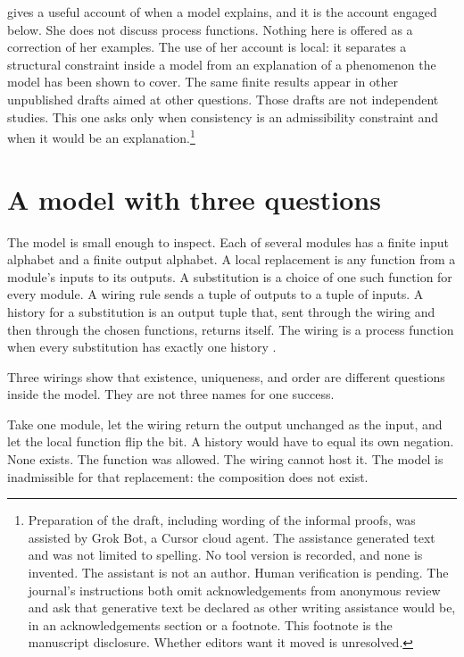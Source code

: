\documentclass[12pt]{article}
\begin{document}
\citet{bokulich2011} gives a useful account of when a model explains, and it is the account engaged below. She does not discuss process functions. Nothing here is offered as a correction of her examples. The use of her account is local: it separates a structural constraint inside a model from an explanation of a phenomenon the model has been shown to cover. The same finite results appear in other unpublished drafts aimed at other questions. Those drafts are not independent studies. This one asks only when consistency is an admissibility constraint and when it would be an explanation.\footnote{Preparation of the draft, including wording of the informal proofs, was assisted by Grok Bot, a Cursor cloud agent. The assistance generated text and was not limited to spelling. No tool version is recorded, and none is invented. The assistant is not an author. Human verification is pending. The journal's instructions both omit acknowledgements from anonymous review and ask that generative text be declared as other writing assistance would be, in an acknowledgements section or a footnote. This footnote is the manuscript disclosure. Whether editors want it moved is unresolved.}

\section{A model with three questions}
\label{sec:model}

The model is small enough to inspect. Each of several modules has a finite input alphabet and a finite output alphabet. A local replacement is any function from a module's inputs to its outputs. A substitution is a choice of one such function for every module. A wiring rule sends a tuple of outputs to a tuple of inputs. A history for a substitution is an output tuple that, sent through the wiring and then through the chosen functions, returns itself. The wiring is a process function when every substitution has exactly one history \citep{baumeler2016}.

Three wirings show that existence, uniqueness, and order are different questions inside the model. They are not three names for one success.

Take one module, let the wiring return the output unchanged as the input, and let the local function flip the bit. A history would have to equal its own negation. None exists. The function was allowed. The wiring cannot host it. The model is inadmissible for that replacement: the composition does not exist.
\end{document}
